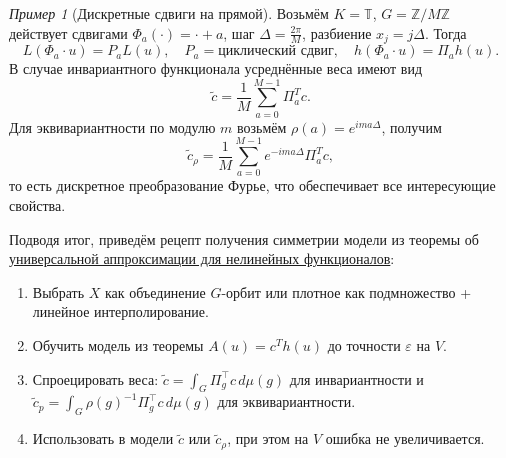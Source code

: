 \documentclass[a4paper, 12pt]{article}
\theoremstyle{definition}
\theoremstyle{plain}
\theoremstyle{remark}
\theoremstyle{remark}
\theoremstyle{remark}
\newtheorem*{example}{Пример}
\begin{document}
\begin{example}[Дискретные сдвиги на прямой]
  Возьмём $K = \mathbb{T}$, $G = \mathbb{Z}/M\mathbb{Z}$ действует сдвигами $\Phi_a(\cdot) = \cdot + a$, шаг $\Delta = \frac{2\pi}{M}$, разбиение $x_j = j\Delta$.
  Тогда
  $$L(\Phi_a \cdot u) = P_a L(u), \quad P_a = \mbox{циклический сдвиг}, \quad h(\Phi_a \cdot u) = \Pi_a h(u).$$
  В случае инвариантного функционала усреднённые веса имеют вид
  $$\widetilde{c} = \frac{1}{M} \sum_{a=0}^{M-1} \Pi_a^T c.$$
  Для эквивариантности по модулю $m$ возьмём $\rho(a) = e^{ima\Delta}$, получим
  $$\widetilde{c}_\rho = \frac{1}{M} \sum_{a=0}^{M-1} e^{-ima\Delta} \Pi_a^T c,$$
  то есть дискретное преобразование Фурье, что обеспечивает все интересующие свойства.
\end{example}
Подводя итог, приведём рецепт получения симметрии модели из теоремы об \hyperref[thm:uat_nonlin]{универсальной аппроксимации для нелинейных функционалов}:
\begin{enumerate}
  \item Выбрать $X$ как объединение $G$-орбит или плотное как подмножество + линейное интерполирование.
  \item Обучить модель из теоремы $A(u) = c^T h(u)$ до точности $\varepsilon$ на $V$.
  \item Спроецировать веса: $\tilde{c} = \int_G \Pi_g^\top c \, d\mu(g)$ для инвариантности и $\tilde{c}_p = \int_G \rho(g)^{-1} \Pi_g^\top c \, d\mu(g)$ для эквивариантности.
  \item Использовать в модели $\tilde{c}$ или $\tilde{c}_\rho$, при этом на $V$ ошибка не увеличивается.
\end{enumerate}
\end{document}
